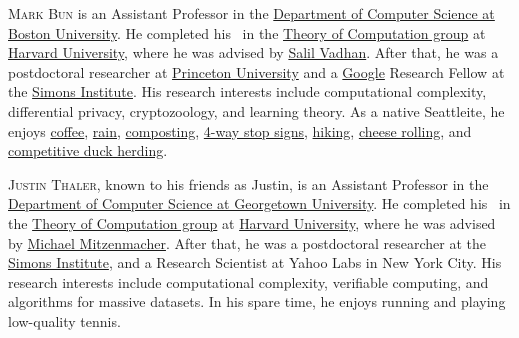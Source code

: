 \documentclass{toc}
\begin{document}
%
%
%
%
%
%
%
%
%
%
%
%
%
%
\begin{tocaboutauthors}
	\begin{tocabout}[bun]
  \textsc{Mark Bun} is an Assistant Professor in the \href{http://www.bu.edu/cs/}{Department of Computer Science at Boston University}. He completed his
\phd\ in the \href{http://toc.seas.harvard.edu/}{Theory of Computation group} at \href{http://www.seas.harvard.edu/}{Harvard University}, where he was advised by \href{http://salil.seas.harvard.edu/}{Salil Vadhan}. After that, he was a postdoctoral researcher at \href{http://theory.cs.princeton.edu/}{Princeton University} and a \href{https://lmgtfy.com/?q=Google}{Google} Research Fellow at the \href{http://simons.berkeley.edu/}{Simons Institute}. His research interests include computational complexity, differential privacy, cryptozoology, and learning theory. As a native Seattleite, he enjoys \href{http://en.wikipedia.org/wiki/Caffeine_dependence}{coffee}, \href{http://en.wikipedia.org/wiki/Rain_(Beatles_song)}{rain}, \href{http://www.cartoonstock.com/cartoonview.asp?catref=rron1324}{composting}, \href{https://www.youtube.com/watch?v=0rpdQvuAnqM}{4-way stop signs}, \href{https://www.mass.gov/mosquitoes-and-ticks}{hiking}, \href{https://en.wikipedia.org/wiki/Cooper\%27s_Hill_Cheese-Rolling_and_Wake}{cheese rolling}, and \href{https://www.youtube.com/watch?v=nMaiBDOGqiQ}{competitive duck herding}.
	\end{tocabout}
	\begin{tocabout}[thaler]  %
      \textsc{Justin Thaler},
known to his friends as Justin, %
is an Assistant Professor in the \href{https://cs.georgetown.edu/}{Department of Computer Science at Georgetown University}. He completed his \phd \ in the \href{http://toc.seas.harvard.edu/}{Theory of Computation group} at \href{http://www.seas.harvard.edu/}{Harvard University}, where he was advised by \href{https://www.eecs.harvard.edu/~michaelm/}{Michael Mitzenmacher}. After that, he was a postdoctoral researcher at the \href{http://simons.berkeley.edu/}{Simons Institute}, and a Research Scientist at Yahoo Labs in New York City. His research interests include computational complexity, verifiable computing, and algorithms for massive datasets. In his spare time, he enjoys running and playing low-quality tennis. 
	\end{tocabout}
\end{tocaboutauthors}
\end{document}
